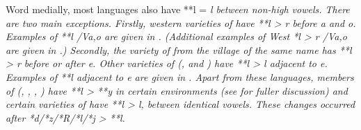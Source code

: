 \clearpage\newpage
Word medially, most languages also have **l = \it{l} between non-high vowels.
There are two main exceptions.
Firstly, western varieties of  have **l > \it{r} before \it{a} and \it{o}.
Examples of **l /V{\gap}\it{a,o} are given in .
(Additional examples of West  *l > \it{r} /V{\gap}a,o are
given in .) Secondly,
the variety of  from the village of the same name
has **l > \it{r} before or after \it{e}.
 Other varieties of  (,
and ) have **l > \it{l} adjacent to \it{e}.
Examples of **l adjacent to \it{e} are given in .
Apart from these languages,
members of  (,
, , ) have **l > **y in certain environments
(see  for fuller discussion)
and certain varieties of  have **l > \it{l},
{\0} between identical vowels.
These changes occurred after *d/*z/*R/*l/*j > **l.

